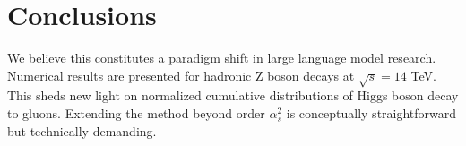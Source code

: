 \section{Conclusions}\label{sec:conclusions}

We believe this constitutes a paradigm shift in large language model
research. Numerical results are presented for hadronic Z boson decays at
$\sqrt{s} = 14$ TeV. This sheds new light on normalized cumulative
distributions of Higgs boson decay to gluons. Extending the method
beyond order $\alpha_s^2$ is conceptually straightforward but
technically demanding.

